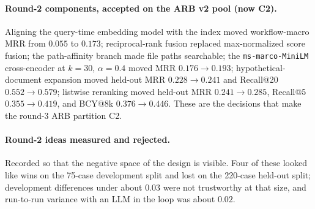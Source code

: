 \documentclass{article}
\begin{document}
\paragraph{Round-2 components, accepted on the ARB v2 pool (now C2).} Aligning the query-time embedding model with the index moved workflow-macro MRR from $0.055$ to $0.173$; reciprocal-rank fusion replaced max-normalized score fusion; the path-affinity branch made file paths searchable; the \texttt{ms-marco-MiniLM} cross-encoder at $k{=}30$, $\alpha{=}0.4$ moved MRR $0.176\to0.193$; hypothetical-document expansion moved held-out MRR $0.228\to0.241$ and Recall@20 $0.552\to0.579$; listwise reranking moved held-out MRR $0.241\to0.285$, Recall@5 $0.355\to0.419$, and BCY@8k $0.376\to0.446$. These are the decisions that make the round-3 ARB partition C2.

\paragraph{Round-2 ideas measured and rejected.} Recorded so that the negative space of the design is visible. Four of these looked like wins on the 75-case development split and lost on the 220-case held-out split; development differences under about $0.03$ were not trustworthy at that size, and run-to-run variance with an LLM in the loop was about $0.02$.
\end{document}
